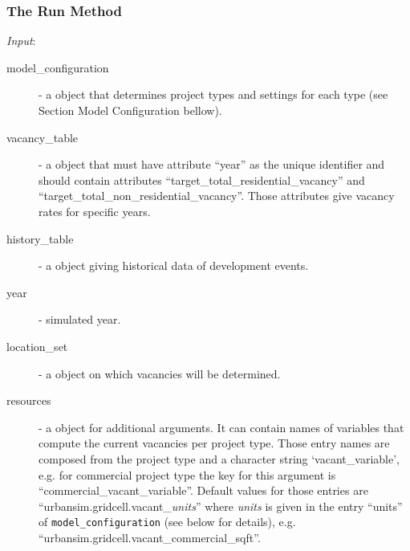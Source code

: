 \subsubsection{The Run Method}
%
{\it Input}:
\begin{description}
\item[model_configuration] - a  object that determines
  project types and settings for each type (see
  Section Model Configuration bellow).
\item[vacancy_table] - a  object that must have attribute 
  ``year'' as the unique identifier and should contain attributes 
  ``target_total_residential_vacancy'' and
  ``target_total_non_residential_vacancy''. Those attributes give vacancy
  rates for specific years.
\item[history_table] - a  object giving historical data of
  development events.
\item[year] - simulated year.
\item[location_set] - a  object on which vacancies will be
  determined.
\item[resources] - a  object for additional arguments. It can
  contain names of variables that compute the current vacancies per project
  type. Those entry names are composed from the project type and a character
  string `vacant_variable', e.g. for commercial project type the key for this
  argument is ``commercial_vacant_variable''.  Default values for those
  entries are ``urbansim.gridcell.vacant_{\it units}'' where {\it units} is
  given in the entry ``units'' of \verb|model_configuration| (see below for details), e.g.
  ``urbansim.gridcell.vacant_commercial_sqft''.
\end{description}


